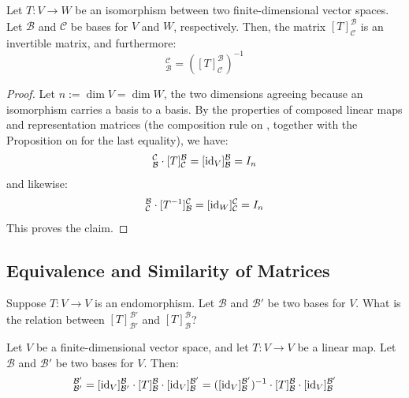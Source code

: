 \begin{proposition}
\label{prop:representation_of_isomorphisms}
Let $T: V \to W$ be an isomorphism between two finite-di\-men\-sional vector spaces. Let $\mathcal{B}$ and $\mathcal{C}$ be bases for $V$ and $W$, respectively. Then, the matrix $[T]_{\mathcal{C}}^{\mathcal{B}}$ is an invertible matrix, and furthermore:
\begin{equation*}
    [T^{-1}]_{\mathcal{B}}^{\mathcal{C}} = ([T]_{\mathcal{C}}^{\mathcal{B}})^{-1}
\end{equation*}
\end{proposition}

\begin{proof}
Let $n := \dim V = \dim W$, the two dimensions agreeing because an isomorphism carries a basis to a basis. By the properties of composed linear maps and representation matrices (the composition rule on , together with the Proposition on  for the last equality), we have:
\begin{equation*}
    [T^{-1}]_{\mathcal{B}}^{\mathcal{C}} \cdot [T]_{\mathcal{C}}^{\mathcal{B}} = [\id_V]_{\mathcal{B}}^{\mathcal{B}} = I_n
\end{equation*}
and likewise:
\begin{equation*}
    [T]_{\mathcal{C}}^{\mathcal{B}} \cdot [T^{-1}]_{\mathcal{B}}^{\mathcal{C}} = [\id_W]_{\mathcal{C}}^{\mathcal{C}} = I_n
\end{equation*}
This proves the claim.
\end{proof}

\subsection{Equivalence and Similarity of Matrices}

\begin{question}
Suppose $T: V \to V$ is an endomorphism. Let $\mathcal{B}$ and $\mathcal{B}'$ be two bases for $V$. What is the relation between $[T]_{\mathcal{B}'}^{\mathcal{B}'}$ and $[T]_{\mathcal{B}}^{\mathcal{B}}$?
\end{question}

\begin{corollary}
\label{cor:similarity_of_representation_matrices}
Let $V$ be a finite-di\-men\-sional vector space, and let $T: V \to V$ be a linear map. Let $\mathcal{B}$ and $\mathcal{B}'$ be two bases for $V$. Then:
\begin{equation*}
    [T]_{\mathcal{B}'}^{\mathcal{B}'} = [\id_V]_{\mathcal{B}'}^{\mathcal{B}} \cdot [T]_{\mathcal{B}}^{\mathcal{B}} \cdot [\id_V]_{\mathcal{B}}^{\mathcal{B}'} = ([\id_V]_{\mathcal{B}}^{\mathcal{B}'})^{-1} \cdot [T]_{\mathcal{B}}^{\mathcal{B}} \cdot [\id_V]_{\mathcal{B}}^{\mathcal{B}'}
\end{equation*}
\end{corollary}

